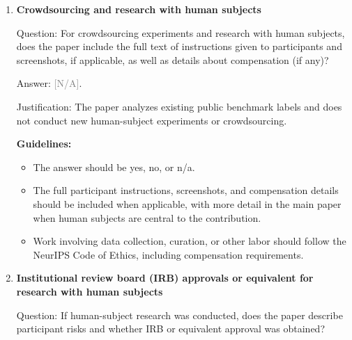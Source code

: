 \documentclass{article}
\theoremstyle{plain}
\theoremstyle{definition}
\newcommand{\1}{\mathbf{1}}
\providecommand{\answerNA}[1][]{\textcolor{gray}{[N/A]#1}}
\begin{document}
\begin{enumerate}[leftmargin=5mm]
Justification: The paper does not introduce a new dataset, benchmark, or
foundation model; generated figures and tables are derived from cited public
benchmarks.

\textbf{Guidelines:}
\begin{itemize}[leftmargin=5mm, noitemsep]
\item The answer should be yes, no, or n/a.
\item The answer n/a means the paper does not release new assets.
\item New datasets, code, or models should be documented with training,
license, limitations, and intended-use details as relevant.
\item Released assets should be anonymized for initial submission when
applicable.
\end{itemize}

\item \textbf{Crowdsourcing and research with human subjects}

Question: For crowdsourcing experiments and research with human subjects, does
the paper include the full text of instructions given to participants and
screenshots, if applicable, as well as details about compensation (if any)?

Answer: \answerNA{}.

Justification: The paper analyzes existing public benchmark labels and does not
conduct new human-subject experiments or crowdsourcing.

\textbf{Guidelines:}
\begin{itemize}[leftmargin=5mm, noitemsep]
\item The answer should be yes, no, or n/a.
\item The full participant instructions, screenshots, and compensation details
should be included when applicable, with more detail in the main paper when
human subjects are central to the contribution.
\item Work involving data collection, curation, or other labor should follow
the NeurIPS Code of Ethics, including compensation requirements.
\end{itemize}

\item \textbf{Institutional review board (IRB) approvals or equivalent for
research with human subjects}

Question: If human-subject research was conducted, does the paper describe
participant risks and whether IRB or equivalent approval was obtained?


\end{enumerate}
\end{document}
